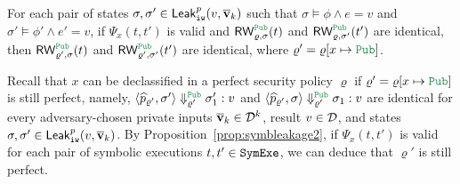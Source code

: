 %

\begin{proposition}\label{prop:symbleakage2}
For each pair of
states $\sigma,\sigma'\in{\sf Leak}_{\tt iw}^p(v,\overline{\bf{v}}_k)$ such that
$\sigma\models \phi\wedge e=v$ and $\sigma'\models \phi'\wedge e'=v$,
if $\Psi_x(t,t')$ is valid and $\RW_{\varrho,\sigma}^{\Pub}(t)$ and $\RW_{\varrho,\sigma'}^{\Pub}(t')$ are identical,
then $\RW_{\varrho',\sigma}^{\Pub}(t)$ and $\RW_{\varrho',\sigma'}^{\Pub}(t')$ are identical,
where $\varrho'=\varrho[x\mapsto \Pub]$.
\end{proposition}

Recall that  $x$ can be declassified in a perfect security policy $\varrho$
if $\varrho'=\varrho[x\mapsto \Pub]$ is still perfect, namely, $\MPCAngle{\widehat{p}_{\varrho'},\sigma'}\Downarrow_{\varrho'}^{\Pub} \sigma_1':v$
and $\MPCAngle{\widehat{p}_{\varrho'},\sigma}\Downarrow_{\varrho'}^{\Pub} \sigma_1:v$ are identical
for every adversary-chosen private inputs $\overline{\bf{v}}_k\in\mathcal{D}^k$, result $v\in\mathcal{D}$,
and states $\sigma,\sigma'\in{\sf Leak}_{\tt iw}^p(v,\overline{\bf{v}}_k)$.
By Proposition~\ref{prop:symbleakage2},
if  $\Psi_x(t,t')$ is valid for each pair of symbolic executions $t,t'\in{\tt SymExe}$,
we can deduce that $\varrho'$ is still perfect.

